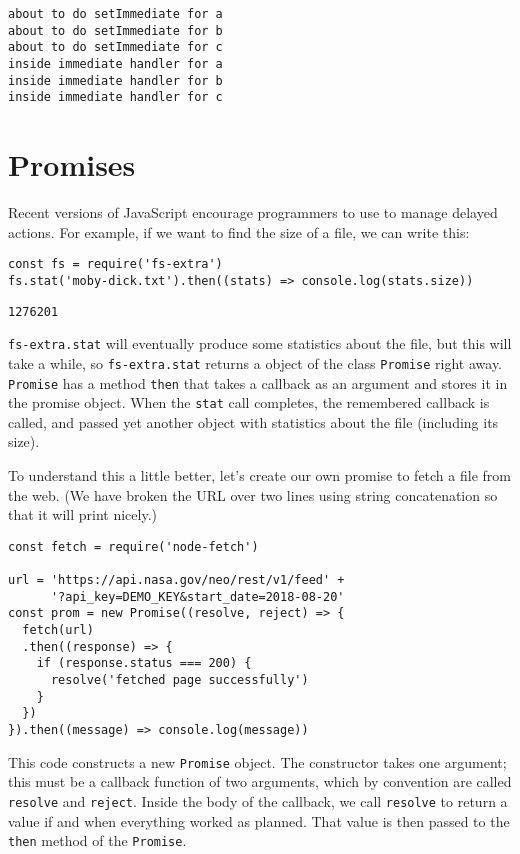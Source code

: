 \begin{verbatim}
about to do setImmediate for a
about to do setImmediate for b
about to do setImmediate for c
inside immediate handler for a
inside immediate handler for b
inside immediate handler for c
\end{verbatim}

\section{Promises}\label{s:promises-promises}

Recent versions of JavaScript encourage programmers to use 
to manage delayed actions.
For example,
if we want to find the size of a file,
we can write this:

\begin{verbatim}
const fs = require('fs-extra')
fs.stat('moby-dick.txt').then((stats) => console.log(stats.size))
\end{verbatim}

\begin{verbatim}
1276201
\end{verbatim}

\texttt{fs-extra.stat} will eventually produce some statistics about the file,
but this will take a while,
so \texttt{fs-extra.stat} returns a object of the class \texttt{Promise} right away.
\texttt{Promise} has a method \texttt{then} that takes a callback as an argument and stores it in the promise object.
When the \texttt{stat} call completes,
the remembered callback is called,
and passed yet another object with statistics about the file (including its size).

To understand this a little better,
let's create our own promise to fetch a file from the web.
(We have broken the URL over two lines using string concatenation
so that it will print nicely.)

\begin{verbatim}
const fetch = require('node-fetch')

url = 'https://api.nasa.gov/neo/rest/v1/feed' +
      '?api_key=DEMO_KEY&start_date=2018-08-20'
const prom = new Promise((resolve, reject) => {
  fetch(url)
  .then((response) => {
    if (response.status === 200) {
      resolve('fetched page successfully')
    }
  })
}).then((message) => console.log(message))
\end{verbatim}

This code constructs a new \texttt{Promise} object.
The constructor takes one argument;
this must be a callback function of two arguments,
which by convention are called \texttt{resolve} and \texttt{reject}.
Inside the body of the callback,
we call \texttt{resolve} to return a value if and when everything worked as planned.
That value is then passed to the \texttt{then} method of the \texttt{Promise}.

